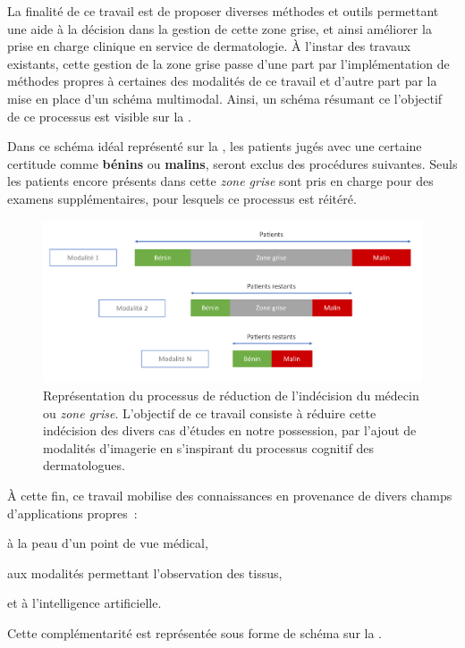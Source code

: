 La finalité de ce travail est de proposer diverses méthodes et outils permettant une aide à la décision dans la gestion de cette zone grise, et ainsi améliorer la prise en charge clinique en service de dermatologie. À l'instar des travaux existants, cette gestion de la zone grise passe d'une part par l'implémentation de méthodes propres à certaines des modalités de ce travail et d'autre part par la mise en place d'un schéma multimodal. Ainsi, un schéma résumant ce l'objectif de ce processus est visible sur la .\par
\clearpage

Dans ce schéma idéal représenté sur la , les patients jugés avec une certaine certitude comme \textbf{bénins} ou \textbf{malins}, seront exclus des procédures suivantes. Seuls les patients encore présents dans cette \textit{zone grise} sont pris en charge pour des examens supplémentaires, pour lesquels ce processus est réitéré.\par 

\begin{figure}[H]
    \centering
    \includegraphics[width=\linewidth]{contents/i_introduction/resources/scheme_reduce_indecision.pdf}
    \caption{Représentation du processus de réduction de l'indécision du médecin ou \textit{zone grise}. L'objectif de ce travail consiste à réduire cette indécision des divers cas d'études en notre possession, par l'ajout de modalités d'imagerie en s'inspirant du processus cognitif des dermatologues.}
    \label{fig:scheme_reduce_indecision}
\end{figure}\par

À cette fin, ce travail mobilise des connaissances en provenance de divers champs d'applications propres~:
\begin{inlinerate}
    \item à la peau d'un point de vue médical, 
    \item aux modalités permettant l'observation des tissus,
    \item et à l'intelligence artificielle.
\end{inlinerate} Cette complémentarité est représentée sous forme de schéma sur la .\par

